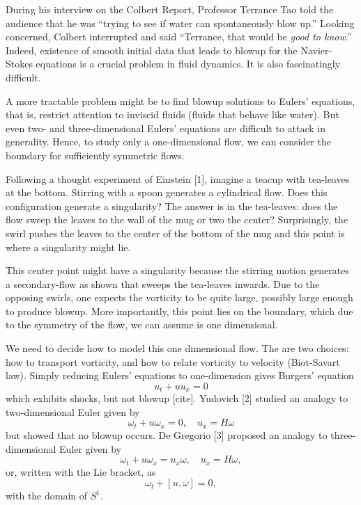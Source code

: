 \documentclass[12pt]{article}
\begin{document}


During his interview on the Colbert Report, Professor Terrance Tao told the audience that he was ``trying to see if water can spontaneously blow up.'' Looking concerned, Colbert interrupted and said ``Terrance, that would be \textit{good to know}.'' Indeed, existence of smooth initial data that leads to blowup for the Navier-Stokes equations is a crucial problem in fluid dynamics. It is also fascinatingly difficult.

A more tractable problem might be to find blowup solutions to Eulers' equations, that is, restrict attention to inviscid fluids (fluids that behave like water). But even two- and three-dimensional Eulers' equations are difficult to attack in generality. Hence, to study only a one-dimensional flow, we can consider the boundary for sufficiently symmetric flows.

Following a thought experiment of Einstein [1], imagine a teacup with tea-leaves at the bottom. Stirring with a spoon generates a cylindrical flow. Does this configuration generate a singularity? The answer is in the tea-leaves: does the flow sweep the leaves to the wall of the mug or two the center? Surprisingly, the swirl pushes the leaves to the center of the bottom of the mug and this point is where a singularity might lie.

This center point might have a singularity because the stirring motion generates a secondary-flow as shown that sweeps the tea-leaves inwards. Due to the opposing swirls, one expects the vorticity to be quite large, possibly large enough to produce blowup. More importantly, this point lies on the boundary, which due to the symmetry of the flow, we can assume is one dimensional.

We need to decide how to model this one dimensional flow. The are two choices: how to transport vorticity, and how to relate vorticity to velocity (Biot-Savart law). Simply reducing Eulers' equations to one-dimension gives Burgers' equation
\[
	u_t + u u_x = 0	
\]
which exhibits shocks, but not blowup [cite]. Yudovich [2] studied an analogy to two-dimensional Euler given by
\[
	\omega_t + u \omega_x = 0, \quad u_x = H \omega
\]
but showed that no blowup occurs. De Gregorio [3] proposed an analogy to three-dimensional Euler given by
\[
	\omega_t + u \omega_x = u_x \omega, \quad u_x = H \omega,
\]
or, written with the Lie bracket, as
\[
	\omega_t + [u, \omega] = 0,
\]
with the domain of $S^1$.
\end{document}
